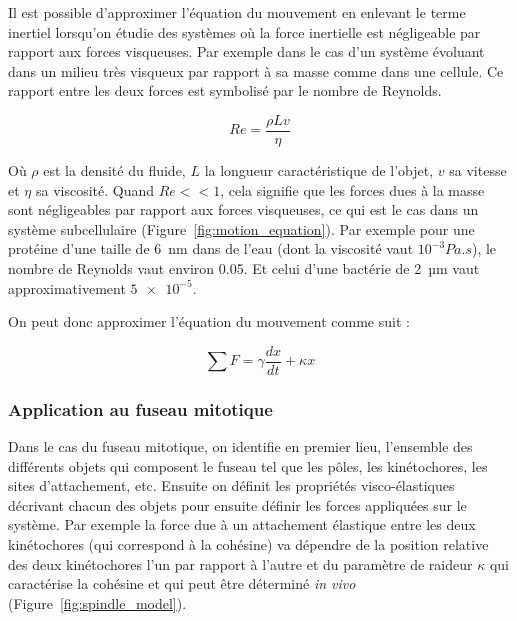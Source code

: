 \documentclass[12pt,a4paper,twoside,openright]{book}
\begin{document}
Il est possible d'approximer l'équation du mouvement en enlevant le
terme inertiel lorsqu'on étudie des systèmes où la force inertielle est
négligeable par rapport aux forces visqueuses. Par exemple dans le cas
d'un système évoluant dans un milieu très visqueux par rapport à sa
masse comme dans une cellule. Ce rapport entre les deux forces est
symbolisé par le nombre de Reynolds.

\[
Re = \frac{\rho Lv}{\eta}
\]

Où \(\rho\) est la densité du fluide, \(L\) la longueur caractéristique
de l'objet, \(v\) sa vitesse et \(\eta\) sa viscosité. Quand
\(Re << 1\), cela signifie que les forces dues à la masse sont
négligeables par rapport aux forces visqueuses, ce qui est le cas dans
un système subcellulaire (Figure~\ref{fig:motion_equation}). Par exemple
pour une protéine d'une taille de 6~nm dans de l'eau (dont la viscosité
vaut \(10^{-3}Pa.s\)), le nombre de Reynolds vaut environ 0.05. Et celui
d'une bactérie de 2~µm vaut approximativement \(\num{5e-5}\).

On peut donc approximer l'équation du mouvement comme suit :

\[
\sum F = \gamma\frac{dx}{dt} + \kappa x
\]

\subsubsection{Application au fuseau
mitotique}\label{application-au-fuseau-mitotique}

Dans le cas du fuseau mitotique, on identifie en premier lieu,
l'ensemble des différents objets qui composent le fuseau tel que les
pôles, les kinétochores, les sites d'attachement, etc. Ensuite on
définit les propriétés visco-élastiques décrivant chacun des objets pour
ensuite définir les forces appliquées sur le système. Par exemple la
force due à un attachement élastique entre les deux kinétochores (qui
correspond à la cohésine) va dépendre de la position relative des deux
kinétochores l'un par rapport à l'autre et du paramètre de raideur
\(\kappa\) qui caractérise la cohésine et qui peut être déterminé
\emph{in vivo} (Figure~\ref{fig:spindle_model}).
\end{document}
